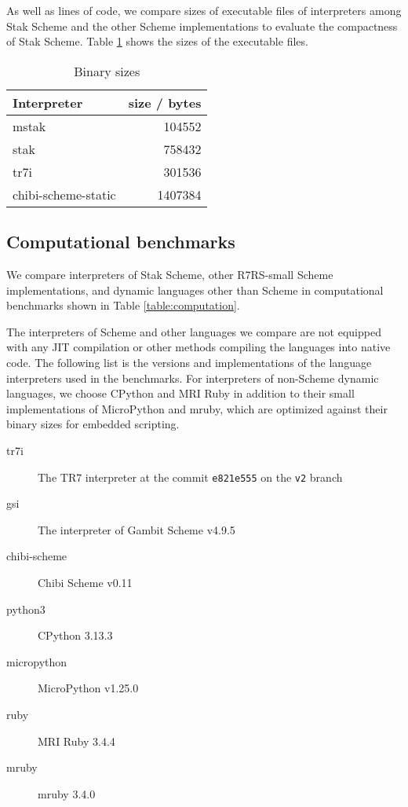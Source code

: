 \documentclass[sigplan, anonymous, review]{acmart}
\begin{document}
As well as lines of code, we compare sizes of executable files of
interpreters among Stak Scheme and the other Scheme implementations
to evaluate the compactness of Stak Scheme.
Table \ref{table:binary} shows the sizes of the executable files.

\begin{table}
  \begin{center}
    \caption{Binary sizes}
    \label{table:binary}
    \begin{tabular}{l|r}
      \hline
      Interpreter & size / bytes \\
      \hline
      mstak & 104552 \\
      stak & 758432 \\
      tr7i & 301536 \\
      chibi-scheme-static & 1407384 \\
      \hline
    \end{tabular}
  \end{center}
\end{table}

\subsection{Computational benchmarks}

We compare interpreters of Stak Scheme, other R7RS-small Scheme
implementations, and
dynamic languages other than Scheme in computational
benchmarks shown in Table \ref{table:computation}.

The interpreters of Scheme and other languages we compare are not equipped with
any JIT compilation or other methods compiling the languages into
native code.
The following list is the versions and implementations of
the language interpreters used in the benchmarks.
For interpreters of non-Scheme dynamic languages, we choose CPython and
MRI Ruby in addition to their small implementations of MicroPython
and mruby, which are optimized against their binary sizes for
embedded scripting.

\begin{description}
  \item[tr7i] The TR7 interpreter at the commit \texttt{e821e555}
    on the \texttt{v2} branch
  \item[gsi] The interpreter of Gambit Scheme v4.9.5
  \item[chibi-scheme] Chibi Scheme v0.11
  \item[python3] CPython 3.13.3
  \item[micropython] MicroPython v1.25.0
  \item[ruby] MRI Ruby 3.4.4
  \item[mruby] mruby 3.4.0
\end{description}
\end{document}
